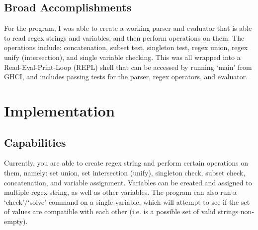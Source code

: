 \documentclass[letterpaper, 11pt]{article}
\begin{document}
\subsection{Broad Accomplishments}\label{sec:accomplications}
For the program, I was able to create a working parser and evaluator that is able to read regex strings and variables, and then perform operations on them.
The operations include: concatenation, subset test, singleton test, regex union, regex unify (intersection), and single variable checking.
This was all wrapped into a Read-Eval-Print-Loop (REPL) shell that can be accessed by running `main' from GHCI, and includes passing tests for the parser, regex operators, and evaluator. 


\section{Implementation}\label{sec:impl}

\subsection{Capabilities}\label{sec:capabilities}
Currently, you are able to create regex string and perform certain operations on them, namely: set union, set intersection (unify), singleton check, subset check, concatenation, and variable assignment.
Variables can be created and assigned to multiple regex string, as well as other variables. 
The program can also run a `check'/`solve' command on a single variable, which will attempt to see if the set of values are compatible with each other (i.e. is a possible set of valid strings non-empty). 
\end{document}
